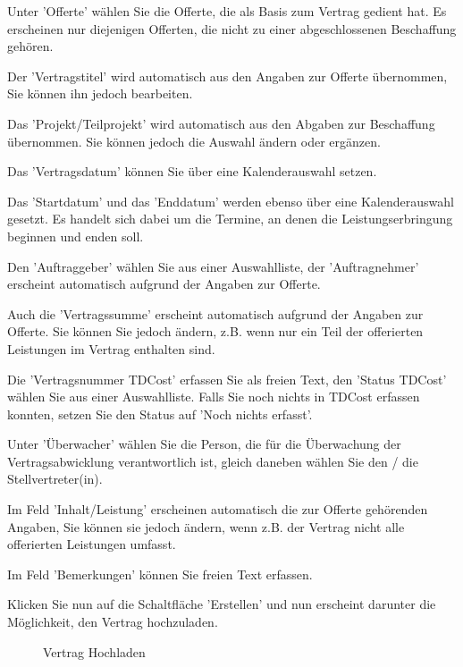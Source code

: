 \begin{compactitem}
\item {\sffamily\color{black}
Unter 'Offerte' wählen Sie die Offerte, die als Basis zum Vertrag gedient hat. Es erscheinen nur diejenigen Offerten, die nicht zu einer abgeschlossenen Beschaffung gehören.}
\item
Der 'Vertragstitel' wird automatisch aus den Angaben zur Offerte übernommen, Sie können ihn jedoch bearbeiten.
\item
Das 'Projekt/Teilprojekt' wird automatisch aus den Abgaben zur Beschaffung übernommen. Sie können jedoch die Auswahl ändern oder ergänzen.
\item
Das 'Vertragsdatum' können Sie über eine Kalenderauswahl setzen.
\item
Das 'Startdatum' und das 'Enddatum' werden ebenso über eine Kalenderauswahl gesetzt. Es handelt sich dabei um die Termine, an denen die Leistungserbringung beginnen und enden soll.
\item
Den 'Auftraggeber' wählen Sie aus einer Auswahlliste, der 'Auftragnehmer' erscheint automatisch aufgrund der Angaben zur Offerte.
\item
Auch die 'Vertragssumme' erscheint automatisch aufgrund der Angaben zur Offerte. Sie können Sie jedoch ändern, z.B. wenn nur ein Teil der offerierten Leistungen im Vertrag enthalten sind.
\item
Die 'Vertragsnummer TDCost' erfassen Sie als freien Text, den 'Status TDCost' wählen Sie aus einer Auswahlliste. Falls Sie noch nichts in TDCost erfassen konnten, setzen Sie den Status auf 'Noch nichts erfasst'.
\item
Unter 'Überwacher' wählen Sie die Person, die für die Überwachung der Vertragsabwicklung verantwortlich ist, gleich daneben wählen Sie den / die Stellvertreter(in).
\item
Im Feld 'Inhalt/Leistung' erscheinen automatisch die zur Offerte gehörenden Angaben, Sie können sie jedoch ändern, wenn z.B. der Vertrag nicht alle offerierten Leistungen umfasst.
\item
Im Feld 'Bemerkungen' können Sie freien Text erfassen.
\end{compactitem}

\vspace{\baselineskip}

Klicken Sie nun auf die Schaltfläche 'Erstellen'  und nun erscheint darunter die Möglichkeit, den Vertrag hochzuladen.

\begin{figure}[H]
\caption{Vertrag Hochladen}
\end{figure}

